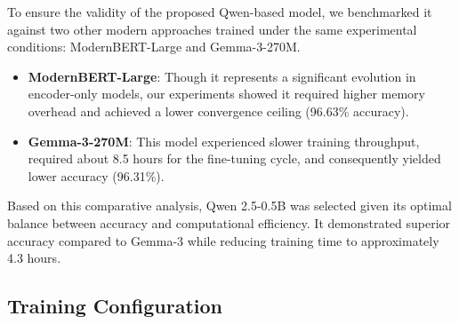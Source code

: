 \documentclass[utf8]{FrontiersinHarvard}
\begin{document}
To ensure the validity of the proposed Qwen-based model, we benchmarked it against two other modern approaches trained under the same experimental conditions: ModernBERT-Large and Gemma-3-270M.

\begin{itemize}
\item \textbf{ModernBERT-Large}: Though it represents a significant evolution in encoder-only models, our experiments showed it required higher memory overhead and achieved a lower convergence ceiling (96.63\% accuracy).

\item \textbf{Gemma-3-270M}: This model experienced slower training throughput, required about 8.5 hours for the fine-tuning cycle, and consequently yielded lower accuracy (96.31\%).
\end{itemize}

Based on this comparative analysis, Qwen 2.5-0.5B was selected given its optimal balance between accuracy and computational efficiency. It demonstrated superior accuracy compared to Gemma-3 while reducing training time to approximately 4.3 hours.

\subsection{Training Configuration}
\end{document}
